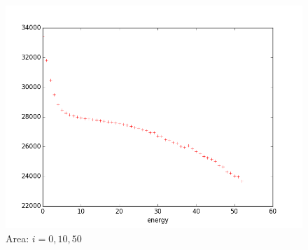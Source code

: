\documentclass{beamer}
\begin{document}
\begin{frame}[allowframebreaks]
\begin{figure}
        \includegraphics[scale=0.15]{img/area-sparse}
        \caption*{Area: $ i = 0, 10, 50 $}
    \end{figure}


\end{frame}
\end{document}
